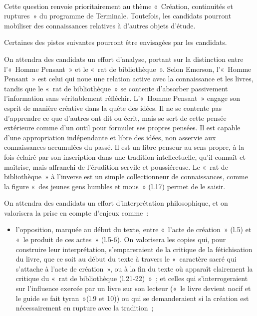 \vfill{~}\clearpage

		{Cette question renvoie prioritairement au thème «~Création, continuités et ruptures~»
du programme de Terminale. Toutefois, les candidats pourront mobiliser des
connaissances relatives à d'autres objets d'étude.

Certaines des pistes suivantes pourront être envisagées par les candidats.

On attendra des candidats un effort d'analyse, portant sur la distinction
entre l'«~Homme Pensant~» et le «~rat de bibliothèque~». Selon Emerson, l'«~Homme
Pensant~» est celui qui noue une relation active avec la connaissance et les livres,
tandis que le «~rat de bibliothèque~» se contente d'absorber passivement l'information
sans véritablement réfléchir. L'«~Homme Pensant~» engage son esprit de manière
créative dans la quête des idées. Il ne se contente pas d'apprendre ce que d'autres
ont dit ou écrit, mais se sert de cette pensée extérieure comme d'un outil pour formuler
ses propres pensées. Il est capable d'une appropriation indépendante et libre des
idées, non asservie aux connaissances accumulées du passé. Il est un libre penseur
au sens propre, à la fois éclairé par son inscription dans une tradition intellectuelle,
qu'il connaît et maîtrise, mais affranchi de l'érudition servile et poussiéreuse. Le «~rat
de bibliothèque~» à l'inverse est un simple collectionneur de connaissances, comme
la figure «~des jeunes gens humbles et mous~» (l.17) permet de le saisir.

On attendra des candidats un effort d'interprétation philosophique, et on valorisera la
prise en compte d'enjeux comme~:

\begin{itemize}
\item l'opposition, marquée au début du texte, entre «~l'acte de création~» (l.5) et «~le
produit de ces actes~» (l.5-6). On valorisera les copies qui, pour construire leur
interprétation, s'empareraient de la critique de la fétichisation du livre, que ce soit au
début du texte à travers le «~caractère sacré qui s'attache à l'acte de création~», ou à
la fin du texte où apparaît clairement la critique du «~rat de bibliothèque (l.21-22)~»~; et
celles qui s'interrogeraient sur l'influence exercée par un livre sur son lecteur («~le livre
devient nocif et le guide se fait tyran~»(l.9 et 10)) ou qui se demanderaient si la création
est nécessairement en rupture avec la tradition~;


\end{itemize}}
